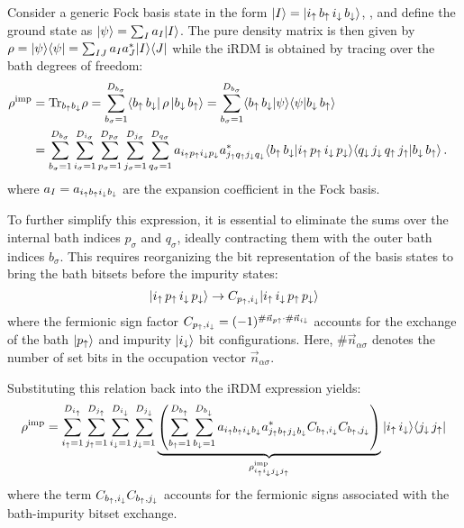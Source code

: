 \documentclass[edipack2.tex]{subfiles}
\begin{document}
Consider a generic Fock basis state in the form 
$|I\rangle =|{i}_\uparrow\,{b}_\uparrow\,{i}_\downarrow\,{b}_\downarrow\rangle$, , and define the 
ground state as $|\psi\rangle = \sum_I a_I |I\rangle$. 
The pure density 
matrix is then given by
$\rho = |\psi\rangle\langle \psi| = \sum_{IJ} a_I a^*_J |I\rangle\langle J|$ 
while the iRDM is obtained by tracing over the bath degrees of 
freedom:
\begin{equation}
  \begin{aligned}
    \rho^\mathrm{imp} &= \Tr_{b_\up b_\dw}{\rho} =
    \sum_{b_\sigma=1}^{D_{b_\sigma}}
    \bra{b_\up\, b_\dw}
    \,\rho\,
    \ket{b_\dw\, b_\up} =
    \sum_{b_\sigma=1}^{D_{b_\sigma}}
    \ibra{b_\up\, b_\dw}
    \ket{\psi}\ibra{\psi}
    \ket{b_\dw\, b_\up}    \cr
    &=
    \sum_{b_\sigma=1}^{D_{b_\sigma}}
    \sum_{i_\sigma=1}^{D_{i_\sigma}}
    \sum_{p_\sigma=1}^{D_{p_\sigma}}
    \sum_{j_\sigma=1}^{D_{j_\sigma}} 
    \sum_{q_\sigma=1}^{D_{q_\sigma}}
    a_{i_\up p_\up i_\dw p_\dw} a^*_{j_\up q_\up j_\dw q_\dw}%
    \langle{b_\up\, b_\dw}|{i_\up\, p_\up\, i_\dw\, p_\dw}\rangle
    \langle{q_\dw \,  j_\dw \, q_\up\, j_\up }|{b_\dw\, b_\up}\rangle\, .
  \end{aligned}
\end{equation}
where $a_I = a_{i_\uparrow b_\uparrow i_\downarrow b_\downarrow}$ are the expansion
coefficient in the Fock basis.

To further simplify this expression, it is essential to eliminate the 
sums over the internal bath indices $p_\sigma$ and $q_\sigma$, ideally 
contracting them with the outer bath indices $b_\sigma$. This requires 
reorganizing the bit representation of the basis states to bring the 
bath bitsets before the impurity states:
$$
|i_\uparrow\, p_\uparrow\, i_\downarrow\, p_\downarrow\rangle \rightarrow C_{p_\uparrow,i_\downarrow} |i_\uparrow\, i_\downarrow \,p_\uparrow\,p_\downarrow\rangle
$$
where the fermionic sign factor
$C_{p_\uparrow,i_\downarrow}  = (-1)^{\#\vec{n}_{p\uparrow} \cdot
  \#\vec{n}_{i\downarrow}}$
accounts for the exchange of the bath $|p_\uparrow\rangle$  and impurity
$|i_\downarrow\rangle$ bit configurations.
Here, $\#\vec{n}_{\alpha\sigma}$ denotes the number of set bits in the 
occupation vector $\vec{n}_{\alpha\sigma}$. 

Substituting this relation back into the iRDM expression yields:
\begin{equation}
    \rho^\mathrm{imp} =
    \sum_{i_\uparrow=1}^{D_{i_\uparrow}}
    \sum_{j_\uparrow=1}^{D_{j_\uparrow}}
    \sum_{i_\downarrow=1}^{D_{i_\downarrow}}
    \sum_{j_\downarrow=1}^{D_{j_\downarrow}}
    \underbrace{\left(
    \sum_{b_\uparrow=1}^{D_{b_\uparrow}}
    \sum_{b_\downarrow=1}^{D_{b_\downarrow}}
    a_{i_\uparrow b_\uparrow i_\downarrow b_\downarrow} a^*_{j_\uparrow b_\uparrow j_\downarrow b_\downarrow}
    C_{b_\uparrow,i_\downarrow}C_{b_\uparrow,j_\downarrow}\right)}_{
    \rho^\mathrm{imp}_{i_\uparrow i_\downarrow j_\downarrow j_\uparrow}}
    |i_\uparrow\, i_\downarrow\rangle\langle j_\downarrow \, j_\uparrow|
  \end{equation}
where the term 
$C_{b_\uparrow,i_\downarrow}C_{b_\uparrow,j_\downarrow}$ accounts for the fermionic 
signs associated with the bath-impurity bitset exchange.
\end{document}
